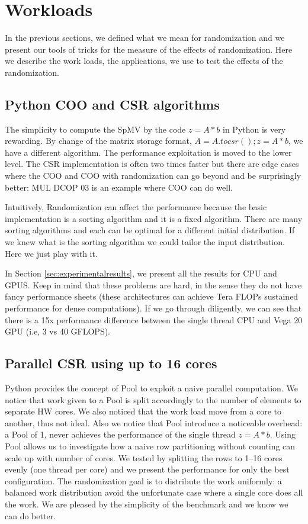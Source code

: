 \documentclass[acmsmall]{acmart}
\begin{document}
\section{Workloads}
\label{sec:workload}

In the previous sections, we defined what we mean for randomization
and we present our tools of tricks for the measure of the effects of
randomization. Here we describe the work loads, the applications, we
use to test the effects of the randomization.

\subsection{Python COO and CSR algorithms}
\label{sec:pythoncoocsr}
The simplicity to compute the SpMV by the code $z = A*b$ in Python is
very rewarding. By change of the matrix storage format, $A =
A.tocsr(); z = A*b$, we have a different algorithm. The performance
exploitation is moved to the lower level.  The CSR implementation is
often two times faster but there are edge cases where the COO and COO
with randomization can go beyond and be surprisingly better: MUL DCOP
03 is an example where COO can do well.

Intuitively, Randomization can affect the performance because the
basic implementation is a sorting algorithm and it is a fixed
algorithm. There are many sorting algorithms and each can be optimal
for a different initial distribution. If we knew what is the sorting
algorithm we could tailor the input distribution. Here we just play
with it.

In Section \ref{sec:experimentalresults}, we present all the results
for CPU and GPUS. Keep in mind that these problems are hard, in the
sense they do not have fancy performance sheets (these architectures
can achieve Tera FLOPs sustained performance for dense computations).
If we go through diligently, we can see that there is a 15x
performance difference between the single thread CPU and Vega 20 GPU
(i.e, 3 vs 40 GFLOPS).

\subsection{Parallel CSR using up to 16 cores}
\label{sec:parcpu}
Python provides the concept of Pool to exploit a naive parallel
computation. We notice that work given to a Pool is split accordingly
to the number of elements to separate HW cores. We also noticed that
the work load move from a core to another, thus not ideal. Also we
notice that Pool introduce a noticeable overhead: a Pool of 1, never
achieves the performance of the single thread $z = A*b$. Using Pool
allows us to investigate how a naive row partitioning without counting
can scale up with number of cores. We tested by splitting the rows to
1--16 cores evenly (one thread per core) and we present the
performance for only the best configuration. The randomization goal is to
distribute the work uniformly: a balanced work distribution avoid the
unfortunate case where a single core does all the work. We are pleased
by the simplicity of the benchmark and we know we can do better.
\end{document}
